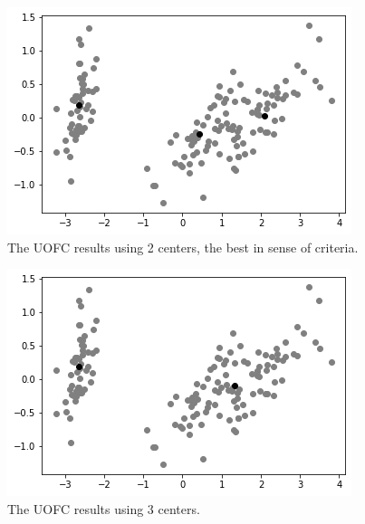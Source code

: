 \documentclass[12pt, a4paper]{paper}
\begin{document}
\begin{figure}[h!]
\centering
\includegraphics[scale=0.7]{iris_best_pca_uofc.png}
\caption{The UOFC results using 2 centers, the best in sense of criteria.}
\label{fig:Circular_3}
\end{figure}

\begin{figure}[h!]
\centering
\includegraphics[scale=0.7]{iris_best_2_pca_uofc.png}
\caption{The UOFC results using 3 centers.}
\label{fig:Circular_3}
\end{figure}

\newpage
\end{document}
